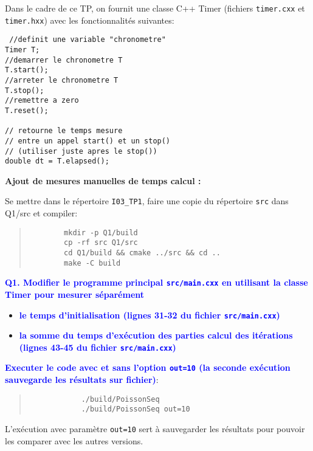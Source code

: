 \documentclass{beamer}
\begin{document}
\begin{frame}[fragile]
Dans le cadre de ce TP, on fournit une classe C++ Timer (fichiers {\tt timer.cxx} et {\tt timer.hxx}) avec les fonctionnalités suivantes:

\begin{lstlisting}
 //definit une variable "chronometre"
Timer T; 
//demarrer le chronometre T
T.start();
//arreter le chronometre T
T.stop();
//remettre a zero
T.reset();

// retourne le temps mesure 
// entre un appel start() et un stop()
// (utiliser juste apres le stop())
double dt = T.elapsed(); 
\end{lstlisting}

\end{frame}

\begin{frame}[fragile]
	
	\vfill
	
	{\bf Ajout de mesures manuelles de temps calcul :}
    \vfill

	Se mettre dans le r\'epertoire {\tt I03\_TP1}, faire une copie du r\'epertoire {\tt src} dans {Q1/src} et compiler:
	\begin{quote}
		\begin{verbatim}
		mkdir -p Q1/build
		cp -rf src Q1/src
		cd Q1/build && cmake ../src && cd ..
		make -C build
		\end{verbatim}
	\end{quote}

	\vfill

\end{frame}

\begin{frame}[fragile]
	\textcolor{blue}{\bf Q1. Modifier le programme principal {\tt src/main.cxx} en utilisant la classe Timer pour mesurer s\'epar\'ement}
	\begin{itemize}
	\item \textcolor{blue}{\bf le temps d'initialisation (lignes 31-32 du fichier {\tt src/main.cxx})}
	\item \textcolor{blue}{\bf la somme du temps d'ex\'ecution des parties calcul des it\'erations (lignes 43-45 du fichier {\tt src/main.cxx})}
	\end{itemize}

	\vfill
	\textcolor{blue}{\bf Executer le code avec et sans l'option {\tt out=10} (la seconde ex\'ecution sauvegarde les r\'esultats sur fichier)}:
	\begin{quote}
		\color{blue}
		\begin{verbatim}
			./build/PoissonSeq
			./build/PoissonSeq out=10
		\end{verbatim}
	\end{quote}

	L'ex\'ecution avec param\`etre {\tt out=10} sert \`a sauvegarder les r\'esultats pour pouvoir les comparer avec les autres versions.
	
\vfill
\end{frame}
\end{document}
